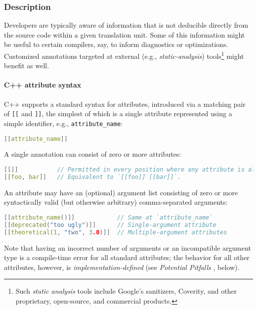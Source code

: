 \documentclass[twoside,10pt,letterpaper,usenames]{newstyle-PearsonGeneric-7-38}
\begin{document}
\subsubsection[Description]{Description}\label{description}

Developers are typically aware of information that is not deducible
directly from the source code within a given translation unit. Some of
this information might be useful to certain compilers, say, to inform
diagnostics or optimizations. Customized annotations targeted at
external (e.g., \emph{static-analysis}) tools{\cprotect\footnote{Such
  \emph{static analysis} tools include Google's sanitizers, Coverity,
  and other proprietary, open-source, and commercial products.}} might
benefit as well.

\paragraph[C++ attribute syntax]{C++ attribute syntax}\label{c++-attribute-syntax}

C++ supports a standard syntax for attributes, introduced via a matching
pair of \texttt{[[} and \texttt{]]}, the simplest of which is a single
attribute represented using a simple identifier, e.g.,
\texttt{attribute\_name}:

\begin{lstlisting}[language=C++,frame=none]
[[attribute_name]]
\end{lstlisting}
    

A single annotation can consist of zero or more attributes:

\begin{lstlisting}[language=C++,frame=none]
[[]]           // Permitted in every position where any attribute is allowed.
[[foo, bar]]   // Equivalent to `[[foo]] [[bar]]`.
\end{lstlisting}
    

An attribute may have an (optional) argument list consisting of zero or
more syntactically valid (but otherwise arbitrary) comma-separated
arguments:

\begin{lstlisting}[language=C++, caption={missing caption}, label={testlabel}, frame=tb]
[[attribute_name()]]            // Same at `attribute_name`
[[deprecated("too ugly")]]      // Single-argument attribute
[[theoretical(1, "two", 3.0)]]  // Multiple-argument attributes
\end{lstlisting}
    

Note that having an incorrect number of arguments or an incompatible
argument type is a compile-time error for all standard attributes; the
behavior for all other attributes, however, is
\emph{implementation-defined} (see \emph{Potential Pitfalls} , below).
\end{document}
